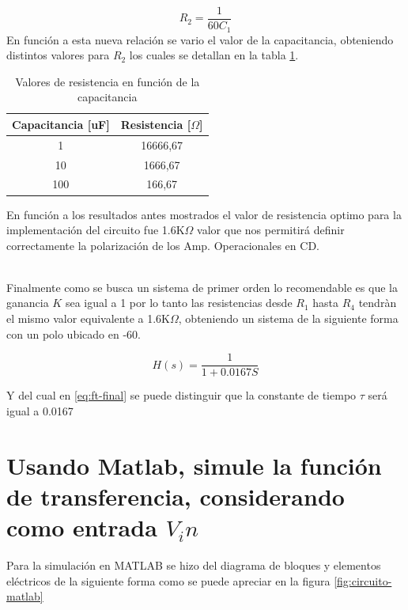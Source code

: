 \documentclass[conference]{IEEEtran}
\begin{document}
	\begin{equation}
		R_2 = \frac{1}{60 C_1}
		\label{eq:calc-resistencia}
	\end{equation}
	En función a esta nueva relación se vario el valor de la capacitancia, obteniendo distintos valores para $R_2$ los cuales se detallan en la tabla \ref{tab:resistencias}.
	
	\begin{table}[h]
		\centering
		\begin{tabular}{|c|c|}
			\hline
			\textbf{Capacitancia [uF]} & \textbf{Resistencia [$\Omega$]} \\ \hline
			1           & 16666,67             \\ \hline
			10          & 1666,67             \\ \hline
			100         & 166,67             \\ \hline
		\end{tabular}
		\caption{Valores de resistencia en función de la capacitancia}
		\label{tab:resistencias}
	\end{table}
	
	En función a los resultados antes mostrados el valor de resistencia optimo para la implementación del circuito fue 1.6K$\Omega$ valor que nos permitirá definir correctamente la polarización de los Amp. Operacionales en CD. \\\
	
	Finalmente como se busca un sistema de primer orden lo recomendable es que la ganancia $K$ sea igual a 1 por lo tanto las resistencias desde $R_1$ hasta $R_4$ tendràn el mismo valor equivalente a 1.6K$\Omega$, obteniendo un sistema de la siguiente forma con un polo ubicado en -60.
	
	\begin{equation}
		H(s) = \frac{1}{1 + 0.0167S}
		\label{eq:ft-final}
	\end{equation}
	
	Y del cual en \ref{eq:ft-final} se puede distinguir que la constante de tiempo $\tau$ será igual a 0.0167
	
	\section{Usando Matlab, simule la función de transferencia, considerando como entrada $V_in$}
	
	Para la simulación en MATLAB se hizo del diagrama de bloques y elementos eléctricos de la siguiente forma como se puede apreciar en la figura \ref{fig:circuito-matlab}
	
\end{document}
